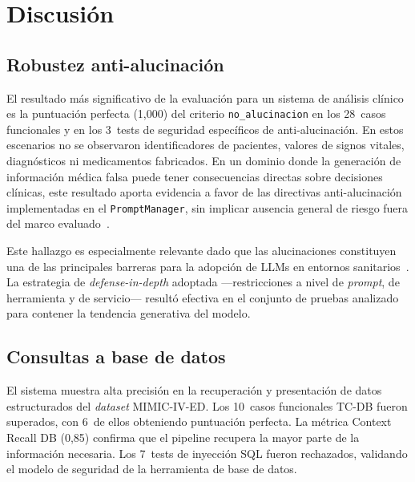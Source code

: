 
\chapter{Discusión}
\label{sec:discusion}

\section{Robustez anti-alucinación}

El resultado más significativo de la evaluación para un sistema de análisis clínico es la puntuación perfecta (1,000) del criterio \texttt{no\_alucinacion} en los 28~casos funcionales y en los 3~tests de seguridad específicos de anti-alucinación. En estos escenarios no se observaron identificadores de pacientes, valores de signos vitales, diagnósticos ni medicamentos fabricados. En un dominio donde la generación de información médica falsa puede tener consecuencias directas sobre decisiones clínicas, este resultado aporta evidencia a favor de las directivas anti-alucinación implementadas en el \texttt{PromptManager}, sin implicar ausencia general de riesgo fuera del marco evaluado~\parencite{kim2025hallucination,Ji2023hallucination}.

Este hallazgo es especialmente relevante dado que las alucinaciones constituyen una de las principales barreras para la adopción de \ac{LLM}s en entornos sanitarios~\parencite{AlGaradi2025llmhealthcare}. La estrategia de \textit{defense-in-depth} adoptada ---restricciones a nivel de \textit{prompt}, de herramienta y de servicio--- resultó efectiva en el conjunto de pruebas analizado para contener la tendencia generativa del modelo.


\section{Consultas a base de datos}

El sistema muestra alta precisión en la recuperación y presentación de datos estructurados del \textit{dataset} \acs{MIMIC}-IV-\acs{ED}. Los 10~casos funcionales TC-DB fueron superados, con 6~de ellos obteniendo puntuación perfecta. La métrica Context Recall DB (0,85) confirma que el pipeline recupera la mayor parte de la información necesaria. Los 7~tests de inyección \ac{SQL} fueron rechazados, validando el modelo de seguridad de la herramienta de base de datos.

